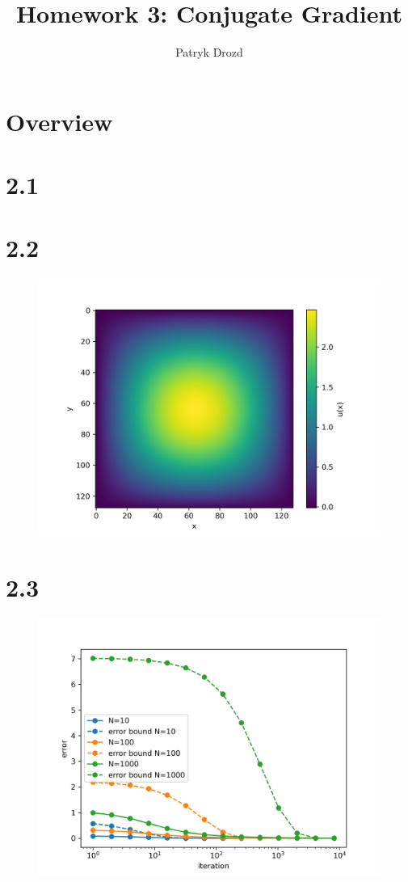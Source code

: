 \documentclass[a4paper]{article}
\title{Homework 3: Conjugate Gradient}
\author{Patryk Drozd}
\begin{document}
\date{}
\maketitle

\section*{Overview}

\section*{2.1}
\section*{2.2}
	
	
	\center

	\begin{figure}[h!]
        \centering
        \includegraphics[width=.8\linewidth]{./q2plot.png}
        \caption{}
        \label{fig:q2_fig}
    \end{figure}	


\section*{2.3}
	
	\begin{figure}[h!]
        \centering
        \includegraphics[width=.8\linewidth]{./q3plot.png}
        \caption{}
        \label{fig:q2_fig}
    \end{figure}	
\end{document}
